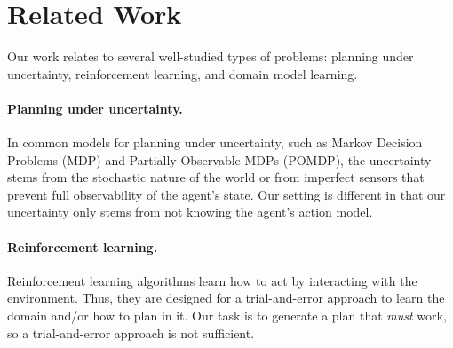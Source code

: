 \documentclass{article}
\begin{document}
	
	\section{Related Work}\label{relatedwork-sec}
	
	Our work relates to several well-studied types of problems: planning under uncertainty, reinforcement learning, and domain model learning. 
	\paragraph{Planning under uncertainty.} In common models for planning under uncertainty, 
	such as Markov Decision Problems (MDP) and Partially Observable MDPs (POMDP), the uncertainty stems from the stochastic nature of the world or from imperfect sensors that prevent full observability of the agent's state. Our setting is different in that our uncertainty only stems from not knowing the agent's action model. 
	
	\paragraph{Reinforcement learning.} Reinforcement learning algorithms learn how to act by interacting with the environment. Thus, they are designed for a trial-and-error approach to learn the domain and/or how to plan in it. Our task is to generate a plan that {\em must} work, so a trial-and-error approach is not sufficient. 
	
\end{document}
